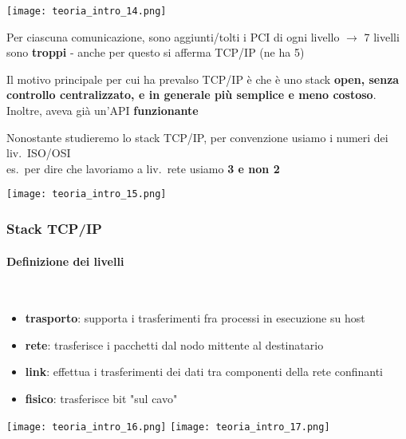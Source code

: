 \begin{center}
  \texttt{[image: teoria\_intro\_14.png]}
\end{center}

\begin{emphasize-blue}[frametitle={Reminder}]
    Per ciascuna comunicazione, sono aggiunti/tolti i PCI di ogni livello $\rightarrow$ 7 livelli sono \textbf{troppi} - anche per questo si afferma TCP/IP (ne ha 5)
\end{emphasize-blue}

\begin{multicols}{2}
Il motivo principale per cui ha prevalso TCP/IP \`e che \`e uno stack \textbf{open, senza controllo centralizzato, e in generale pi\`u semplice e meno costoso}. Inoltre, aveva gi\`a un'API \textbf{funzionante}
\begin{emphasize}
    Nonostante studieremo lo stack TCP/IP, per convenzione usiamo i numeri dei liv.~ISO/OSI\\
    es.~per dire che lavoriamo a liv.~rete usiamo \textbf{3 e non 2}
\end{emphasize}
\centering
\texttt{[image: teoria\_intro\_15.png]}
\end{multicols}

\subsubsection{Stack TCP/IP}

\paragraph{Definizione dei livelli}~\\
\noindent\begin{minipage}[c]{.5\textwidth}
\begin{itemize}
  \item[4.] \textbf{trasporto}: supporta i trasferimenti fra processi in esecuzione su host
  \item[3.] \textbf{rete}: trasferisce i pacchetti dal nodo mittente al destinatario
  \item[2.] \textbf{link}: effettua i trasferimenti dei dati tra componenti della rete confinanti
  \item[1.] \textbf{fisico}: trasferisce bit "sul cavo"
\end{itemize}
\end{minipage}
\begin{minipage}[c]{.5\textwidth}
  \texttt{[image: teoria\_intro\_16.png]}
  \texttt{[image: teoria\_intro\_17.png]}
\end{minipage}\\

